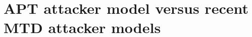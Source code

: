 \documentclass{cshonours}
\begin{document}



\section{APT attacker model versus recent MTD attacker models}
\label{sec:fidelity-verdict}
\end{document}
